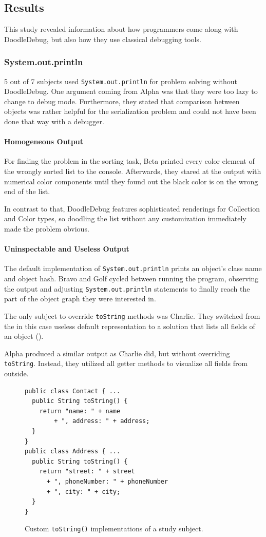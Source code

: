 \documentclass[english]{scrartcl}
\newcommand{\DD}{Dood\-le\-De\-bug\xspace}
\newcommand{\println}{\texttt{Sys\-tem.\-out.\-println}\xspace}
\begin{document}
\subsection{Results}
This study revealed information about how programmers come along with \DD, but also how they use classical debugging tools.

\subsubsection{System.out.println}
5 out of 7 subjects used \println for problem solving without \DD.
One argument coming from Alpha was that they were too lazy to change to debug mode.
Furthermore, they stated that comparison between objects was rather helpful for the serialization problem and could not have been done that way with a debugger.

\paragraph{Homogeneous Output}
For finding the problem in the sorting task, Beta printed every color element of the wrongly sorted list to the console.
Afterwards, they stared at the output with numerical color components until they found out the black color is on the wrong end of the list.

In contrast to that, \DD features sophisticated renderings for Collection and Color types, so doodling the list without any customization immediately made the problem obvious.

\paragraph{Uninspectable and Useless Output}
The default implementation of \println prints an object's class name and object hash.
Bravo and Golf cycled between running the program, observing the output and adjusting \println statements to finally reach the part of the object graph they were interested in.

The only subject to override \texttt{toString} methods was Charlie.
They switched from the in this case useless default representation to a solution that lists all fields of an object ().

Alpha produced a similar output as Charlie did, but without overriding \texttt{toString}.
Instead, they utilized all getter methods to visualize all fields from outside.

\begin{figure}[h]
\begin{lstlisting}
public class Contact { ...
  public String toString() { 
    return "name: " + name 
        + ", address: " + address;
  }
}
public class Address { ...
  public String toString() {
    return "street: " + street
      + ", phoneNumber: " + phoneNumber
      + ", city: " + city;
  }
}
\end{lstlisting}
  \caption{Custom \texttt{toString()} implementations of a study subject.}
\end{figure}
\end{document}
